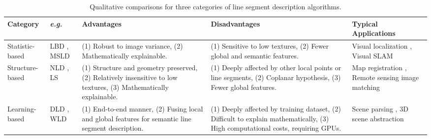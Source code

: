 \documentclass[journal,compsoc]{IEEEtran}
\begin{document}
\begin{table*}[tbp] 	
	\centering 	
	\scriptsize 	
	\caption{Qualitative comparisons for three categories of line segment description algorithms.}		 	\begin{tabular}{|p{}<{\centering}|p{}<{\centering}|p{}<{\centering}|p{}<{\centering}|p{}<{\centering}|} 		
		\hline 		Category       & \textit{e.g.} & Advantages                                                                                                                                  & Disadvantages                                                                                                                      & Typical Applications                                \\ \hline 		Statistic-based    & LBD \cite{LBD}, MSLD \cite{MSLD}         & (1) Robust to image variance, (2) Mathematically explainable. & (1) Sensitive to low textures, (2) Fewer global and semantic features.                    & Visual localization \cite{9106407}, Visual SLAM \cite{9856705} \\ \hline 		Structure-based & NLD \cite{NovelSimilarityInvariantLineDescriptorandMatchingAlgorithmforGlobalMotionEstimation}, LS \cite{WidebaselineimagematchingusingLineSignatures}           & (1) Structure and geometry preserved, (2) Relatively insensitive to low textures, (3) Mathematically explainable.                                                  & (1) Deeply affected by other local points or line segments, (2) Coplanar hypothesis, (3) Fewer global features.           & Map registration \cite{Anovelsimilarityinvariantlinedescriptorforgeometricmapregistration,NovelSimilarityInvariantLineDescriptorandMatchingAlgorithmforGlobalMotionEstimation}, Remote sensing image matching \cite{Robustaffineinvariantlinematchingforhighresolutionremotesensingimages} \\ \hline 		Learning-based & DLD \cite{DLD}, WLD \cite{WLD}              & (1) End-to-end manner, (2)   Fusing local and global features for semantic line segment description.                                      & (1) Deeply affected by training dataset, (2) Difficult to explain mathematically, (3) High computational costs, requiring GPUs. &  Scene parsing \cite{6619245}, 3D scene abstraction \cite{HOFER2017167}                 \\ \hline 	
	\end{tabular} 	
	\label{line_segment_description_comparsion} 
\end{table*}
\end{document}
